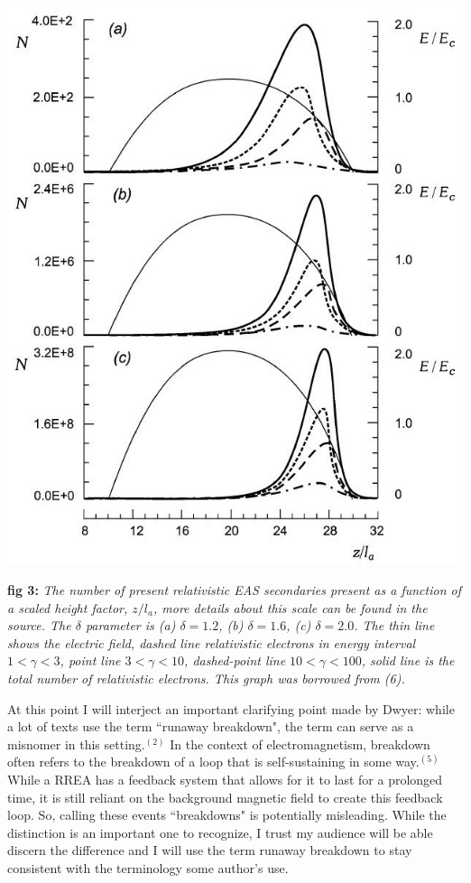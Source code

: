 \documentclass[11pt]{article}
\begin{document}
    
    \begin{center}
        \includegraphics[width=0.5 \linewidth]{images/Dependence on relativistic electrons plot.JPG}
    \end{center}
    \textbf{fig 3:} \textit{The number of present relativistic EAS secondaries present as a function of a scaled height factor, $z/l_a$, more details about this scale can be found in the source. The $\delta$ parameter is (a) $\delta = 1.2$, (b) $\delta = 1.6$, (c) $\delta = 2.0$. The thin line shows the electric field, dashed line relativistic electrons in energy interval $1< \gamma <3$, point line $3< \gamma < 10$, dashed-point line $10< \gamma <100$, solid line is the total number of relativistic electrons. This graph was borrowed from (6).}
    
    At this point I will interject an important clarifying point made by Dwyer: while a lot of texts use the term ``runaway breakdown", the term can serve as a misnomer in this setting.$^{(2)}$ In the context of electromagnetism, breakdown often refers to the breakdown of a loop that is self-sustaining in some way.$^{(5)}$ While a RREA has a feedback system that allows for it to last for a prolonged time, it is still reliant on the background magnetic field to create this feedback loop. So, calling these events ``breakdowns" is potentially misleading. While the distinction is an important one to recognize, I trust my audience will be able discern the difference and I will use the term runaway breakdown to stay consistent with the terminology some author's use.
    
\end{document}
